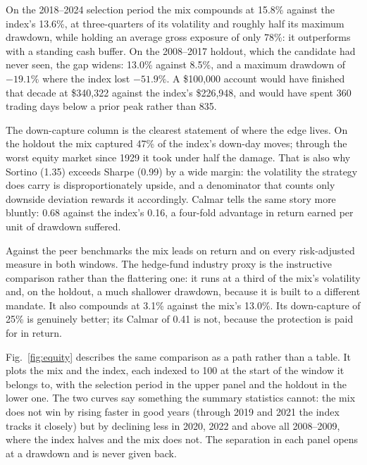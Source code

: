 \documentclass[10pt,twocolumn]{IEEEtran}
\begin{document}
On the 2018--2024 selection period the mix compounds at 15.8\% against the
index's 13.6\%, at three-quarters of its volatility and roughly half its
maximum drawdown, while holding an average gross exposure of only 78\%: it
outperforms with a standing cash buffer. On the 2008--2017 holdout, which the
candidate had never seen, the gap widens: 13.0\% against 8.5\%, and a maximum
drawdown of $-19.1\%$ where the index lost $-51.9\%$. A \$100{,}000 account
would have finished that decade at \$340{,}322 against the index's \$226{,}948,
and would have spent 360 trading days below a prior peak rather than 835.

The down-capture column is the clearest statement of where the edge lives. On
the holdout the mix captured 47\% of the index's down-day moves; through the
worst equity market since 1929 it took under half the damage. That is also why
Sortino (1.35) exceeds Sharpe (0.99) by a wide margin: the volatility the
strategy does carry is disproportionately upside, and a denominator that
counts only downside deviation \cite{sortino1994downside} rewards it
accordingly. Calmar \cite{young1991calmar} tells the same story more bluntly:
0.68 against the index's 0.16, a four-fold advantage in return earned per
unit of drawdown suffered.

Against the peer benchmarks the mix leads on return and on every risk-adjusted
measure in both windows. The hedge-fund industry proxy is the instructive
comparison rather than the flattering one: it runs at a third of the mix's
volatility and, on the holdout, a much shallower drawdown, because it is built
to a different mandate. It also compounds at 3.1\% against the mix's 13.0\%.
Its down-capture of 25\% is genuinely better; its Calmar of 0.41 is not,
because the protection is paid for in return.

Fig.~\ref{fig:equity} describes the same comparison as a path rather than a
table. It plots the mix and the index, each indexed to 100 at the start of the
window it belongs to, with the selection period in the upper
panel and the holdout in the lower one. The two curves say something the
summary statistics cannot: the mix does not win by rising faster in good years
(through 2019 and 2021 the index tracks it closely) but by declining less
in 2020, 2022 and above all 2008--2009, where the index halves and the mix does
not. The separation in each panel opens at a drawdown and is never given back.
\end{document}
